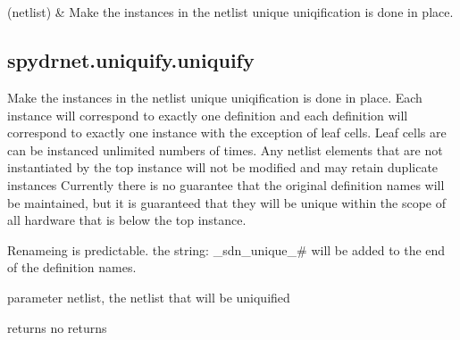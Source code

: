 \documentclass[letterpaper,10pt,english,openany,oneside]{sphinxmanual}
\begin{document}
\begin{savenotes}\sphinxatlongtablestart\begin{longtable}[c]{}
\hline

\endfirsthead

%
{}\\
\hline

\endhead

\hline
{}\\
\endfoot

\endlastfoot

{\hyperref[\detokenize{reference/classes/generated/spydrnet.uniquify.uniquify:spydrnet.uniquify.uniquify}]{}}(netlist)
&
Make the instances in the netlist unique uniqification is done in place.
\\
\hline
\end{longtable}\sphinxatlongtableend\end{savenotes}


\subsection{spydrnet.uniquify.uniquify}
\label{\detokenize{reference/classes/generated/spydrnet.uniquify.uniquify:spydrnet-uniquify-uniquify}}\label{\detokenize{reference/classes/generated/spydrnet.uniquify.uniquify::doc}}

\begin{fulllineitems}
\label{\detokenize{reference/classes/generated/spydrnet.uniquify.uniquify:spydrnet.uniquify.uniquify}}
Make the instances in the netlist unique
uniqification is done in place. Each instance will correspond to exactly one definition and each definition will correspond to exactly one instance with the exception of leaf cells.
Leaf cells are can be instanced unlimited numbers of times. Any netlist elements that are not instantiated by the top instance will not be modified and may retain duplicate instances
Currently there is no guarantee that the original definition names will be maintained, but it is guaranteed that they will be unique within the scope of all hardware that is below the top instance.

Renameing is predictable. the string: \_sdn\_unique\_\# will be added to the end of the definition names.

parameter \sphinxhyphen{} netlist, the netlist that will be uniquified

returns \sphinxhyphen{} no returns

\end{fulllineitems}
\end{document}
